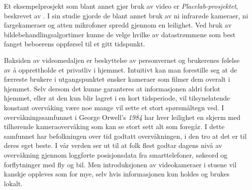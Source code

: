 {Et eksempelprosjekt som blant annet gjør bruk av video er \emph{Placelab-prosjektet}, beskrevet av \citet{placelab05}. I sin studie gjorde de blant annet bruk av ni infrarøde kameraer, ni fargekameraer og atten mikrofoner spredd gjennom en leilighet. Ved bruk av bildebehandlingsalgortimer kunne de velge hvilke av datastrømmene som best fanget beboerens oppførsel til et gitt tidspunkt.

Baksiden av videomedaljen er beskyttelse av personvernet og brukerenes følelse av å opprettholde et privatliv i hjemmet. Intuitivt kan man forestille seg at de færreste brukere i utgangspunktet ønsker kameraer som filmer dem overalt i hjemmet. Selv dersom det kunne garanteres at informasjonen aldri forlot hjemmet, eller at den kun blir lagret i en kort tidsperiode, vil tilsynelatende konstant overvåking være noe mange vil sette et stort spørsmåltegn ved. I overvåkningssamfunnet i George Orwell's \emph{1984} har hver leilighet en skjerm med tilhørende kameraovervåking som kan se stort sett alt som foregår. I dette samfunnet har befolkningen over tid godtatt overvåkningen, i den tro at det er til deres eget beste. I vår verden ser ut til at folk flest godtar dagens nivå av overvåkning gjennom loggførte posisjonsdata fra smarttelefoner, søkeord og forflytninger med fly og bil. Men introduksjonen av videokameraer i stuene vil kanskje oppleves som for mye, selv hvis informasjonen kun holdes og brukes lokalt.
}

